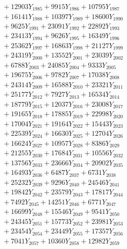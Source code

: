 \documentclass[a4paper,10pt]{article}
\begin{document}
{\begin{align}
&\;  + 12903 Y_{1985} + 9915 Y_{1986} + 10795 Y_{1987} \\[0.3ex]
&\;  + 16141 Y_{1988} + 10397 Y_{1989} + 18600 Y_{1990} \\[0.3ex]
&\;  + 9625 Y_{1991} + 23091 Y_{1992} + 22892 Y_{1993} \\[0.3ex]
&\;  + 23413 Y_{1994} + 9626 Y_{1995} + 16349 Y_{1996} \\[0.3ex]
&\;  + 25362 Y_{1997} + 16863 Y_{1998} + 21127 Y_{1999} \\[0.3ex]
&\;  + 24319 Y_{2000} + 13552 Y_{2001} + 23039 Y_{2002} \\[0.3ex]
&\;  + 6788 Y_{2003} + 24085 Y_{2004} + 9333 Y_{2005} \\[0.3ex]
&\;  + 19675 Y_{2006} + 9782 Y_{2007} + 17038 Y_{2008} \\[0.5ex]\allowbreak
&\;  + 24314 Y_{2009} + 16588 Y_{2010} + 23321 Y_{2011} \\[0.3ex]
&\;  + 25177 Y_{2012} + 7927 Y_{2013} + 16534 Y_{2014} \\[0.3ex]
&\;  + 18779 Y_{2015} + 12037 Y_{2016} + 23008 Y_{2017} \\[0.3ex]
&\;  + 19165 Y_{2018} + 17885 Y_{2019} + 22998 Y_{2020} \\[0.3ex]
&\;  + 17004 Y_{2021} + 19164 Y_{2022} + 15443 Y_{2023} \\[0.3ex]
&\;  + 22539 Y_{2024} + 16630 Y_{2025} + 12704 Y_{2026} \\[0.3ex]
&\;  + 16624 Y_{2027} + 10957 Y_{2028} + 8386 Y_{2029} \\[0.3ex]
&\;  + 21255 Y_{2030} + 17684 Y_{2031} + 10556 Y_{2032} \\[0.3ex]
&\;  + 13756 Y_{2033} + 23666 Y_{2034} + 20902 Y_{2035} \\[0.3ex]
&\;  + 16493 Y_{2036} + 6487 Y_{2037} + 6731 Y_{2038} \\[0.5ex]\allowbreak
&\;  + 25232 Y_{2039} + 9296 Y_{2040} + 24546 Y_{2041} \\[0.3ex]
&\;  + 19842 Y_{2042} + 23579 Y_{2043} + 17817 Y_{2044} \\[0.3ex]
&\;  + 7492 Y_{2045} + 14251 Y_{2046} + 6771 Y_{2047} \\[0.3ex]
&\;  + 16699 Y_{2048} + 15546 Y_{2049} + 9541 Y_{2050} \\[0.3ex]
&\;  + 24345 Y_{2051} + 15773 Y_{2052} + 23981 Y_{2053} \\[0.3ex]
&\;  + 23454 Y_{2054} + 23449 Y_{2055} + 17357 Y_{2056} \\[0.3ex]
&\;  + 7041 Y_{2057} + 10360 Y_{2058} + 12982 Y_{2059} \\[0.3ex]

\end{align}}
\end{document}
